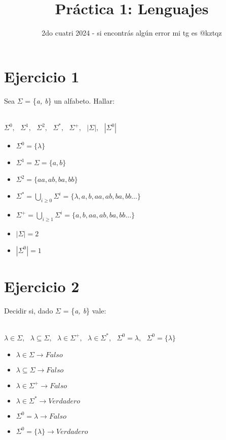 \documentclass{article}
\begin{document}
\title{Práctica 1: Lenguajes}
\date{2do cuatri 2024 - si encontrás algún error mi tg es @kztqz}

\renewcommand{\baselinestretch}{1.5} 

\maketitle

\section*{Ejercicio 1}{Sea $\Sigma$ = \{\textit{a, b}\} un alfabeto. Hallar:
\\
\\
\centerline{$\Sigma^0,\ \ \ \Sigma^1,\ \ \ \Sigma^2,\ \ \ \Sigma^*,\ \ \ \Sigma^+,\ \ \ |\Sigma|,\ \ \ |\Sigma^0|$}

\begin{itemize}
    \item $\Sigma^0 = \{\lambda\}$
    \item $\Sigma^1 = \Sigma = \{a, b\}$
    \item $\Sigma^2 = \{aa, ab, ba, bb\}$
    \item $\Sigma^* = \bigcup\limits_{i \ge 0}\Sigma^i = \{\lambda, a, b, aa, ab, ba, bb...\}$
    \item $\Sigma^+ = \bigcup\limits_{i \ge 1}\Sigma^i = \{a, b, aa, ab, ba, bb...\}$
    \item $|\Sigma| = 2$
    \item $|\Sigma^0| = 1$
\end{itemize}

\section*{Ejercicio 2}{Decidir si, dado $\Sigma$ = \{\textit{a, b}\} vale:}
\\
\\
\centerline{$\lambda\in\Sigma,\ \ \ \lambda\subseteq\Sigma,\ \ \ \lambda\in\Sigma^+,\ \ \ \lambda\in\Sigma^*,\ \ \ \Sigma^0=\lambda,\ \ \ \Sigma^0=\{\lambda\}$}

\begin{itemize}
    \item $\lambda\in\Sigma \rightarrow {Falso}$ 
    \item $\lambda\subseteq\Sigma \rightarrow {Falso}$ 
    \item $\lambda\in\Sigma^+ \rightarrow {Falso}$ 
    \item $\lambda\in\Sigma^* \rightarrow {Verdadero}$ 
    \item $\Sigma^0=\lambda \rightarrow {Falso}$ 
    \item $\Sigma^0=\{\lambda\} \rightarrow {Verdadero}$ 
\end{itemize}

}
\end{document}
